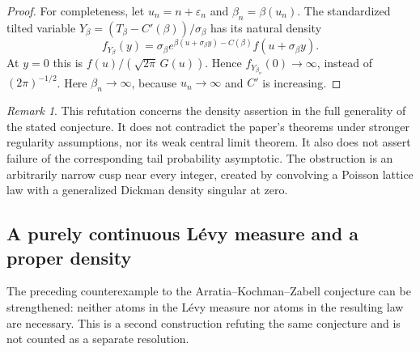 \documentclass[11pt,a4paper]{article}
\theoremstyle{definition}
\theoremstyle{remark}
\newtheorem{remark}[theorem]{Remark}
\numberwithin{equation}{section}
\begin{document}
\begin{proof}
For completeness, let $u_n=n+\varepsilon_n$ and
$\beta_n=\beta(u_n)$. The standardized tilted variable
$Y_\beta=(T_\beta-C'(\beta))/\sigma_\beta$ has its natural density
\[
 f_{Y_\beta}(y)=\sigma_\beta
 e^{\beta(u+\sigma_\beta y)-C(\beta)}
 f(u+\sigma_\beta y).
\]
At $y=0$ this is
$f(u)/(\sqrt{2\pi}\,G(u))$. Hence
$f_{Y_{\beta_n}}(0)\to\infty$, instead of $(2\pi)^{-1/2}$.
Here $\beta_n\to\infty$, because $u_n\to\infty$ and $C'$ is increasing.
\end{proof}

\begin{remark}
This refutation concerns the density assertion in the full generality
of the stated conjecture. It does not contradict the paper's theorems
under stronger regularity assumptions, nor its weak central limit
theorem. It also does not assert failure of the corresponding tail
probability asymptotic. The obstruction is an arbitrarily narrow cusp
near every integer, created by convolving a Poisson lattice law with
a generalized Dickman density singular at zero.
\end{remark}


\subsection{A purely continuous L\'evy measure and a proper density}

The preceding counterexample to the Arratia--Kochman--Zabell conjecture
can be strengthened: neither atoms in the L\'evy measure nor atoms in
the resulting law are necessary. This is a second construction refuting
the same conjecture and is not counted as a separate resolution.
\end{document}

